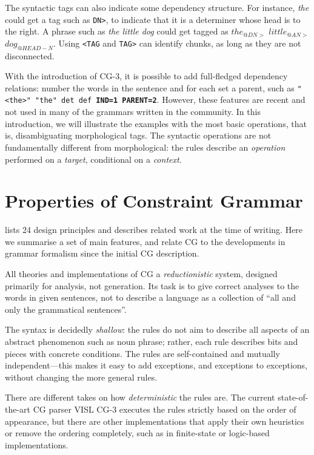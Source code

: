 The syntactic tags can also indicate some dependency structure. For
instance, \emph{the} could get a tag such as
\texttt{DN\textgreater}, to indicate that it is a determiner whose
head is to the right. A phrase such as \emph{the little dog} could get
tagged as  $the_{@DN>}$ $little_{@AN>}$ $dog_{@HEAD-N}$.
Using \texttt{\textless{}TAG} and \texttt{TAG\textgreater} can identify
chunks, as long as they are not disconnected.

With the introduction of CG-3, it is possible to add full-fledged dependency
relations: number the words in the sentence and for each set a parent,
such as \texttt{"<the>" "the" det def  \textbf{IND=1 PARENT=2}}. 
However, these features are recent and not used in many of the grammars written 
in the community. In this introduction, we will illustrate the examples with the 
most basic operations, that is, disambiguating morphological tags.
The syntactic operations are not fundamentally
different from morphological: the rules describe an \emph{operation}
performed on a \emph{target}, conditional on a \emph{context}.




\section{Properties of Constraint Grammar}\label{properties}

\cite{karlsson1995constraint} lists 24 design principles and describes
related work at the time of writing.
Here we summarise a set of main features, and relate CG to the developments in grammar formalism since the initial CG description.

All theories and implementations of CG  a \emph{reductionistic}
system, designed primarily for analysis, not generation.
Its task is to give correct analyses to the words in given sentences,
not to describe a language as a collection of ``all and only the grammatical sentences''.

The syntax is decidedly \emph{shallow}: the rules do not aim to
describe all aspects of an abstract phenomenon such as noun phrase; 
rather, each rule describes bits and pieces with concrete conditions.
The rules are self-contained and mutually independent---this makes it 
easy to add exceptions, and exceptions to exceptions, without 
changing the more general rules.

There are different takes on how \emph{deterministic} the rules are.
The current state-of-the-art CG parser VISL CG-3 executes the rules strictly based on the order of appearance, but there
are other implementations that apply their own heuristics or remove the
ordering completely, such as in finite-state or logic-based implementations. 

